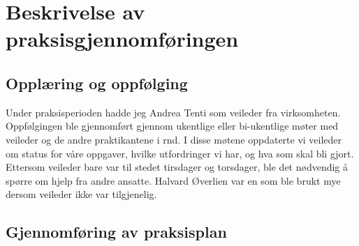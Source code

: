 \section{Beskrivelse av praksisgjennomføringen}

\subsection{Opplæring og oppfølging}
Under praksisperioden hadde jeg Andrea Tenti som veileder fra virksomheten. Oppfølgingen ble gjennomført gjennom ukentlige eller bi-ukentlige møter med veileder og de andre praktikantene i \gls{rnd}. I disse møtene oppdaterte vi veileder om status for våre oppgaver, hvilke utfordringer vi har, og hva som skal bli gjort. Ettersom veileder bare var til stedet tirsdager og torsdager, ble det nødvendig å spørre om hjelp fra andre ansatte. Halvard Øverlien var en som ble brukt mye dersom veileder ikke var tilgjenelig.

\subsection{Gjennomføring av praksisplan}




